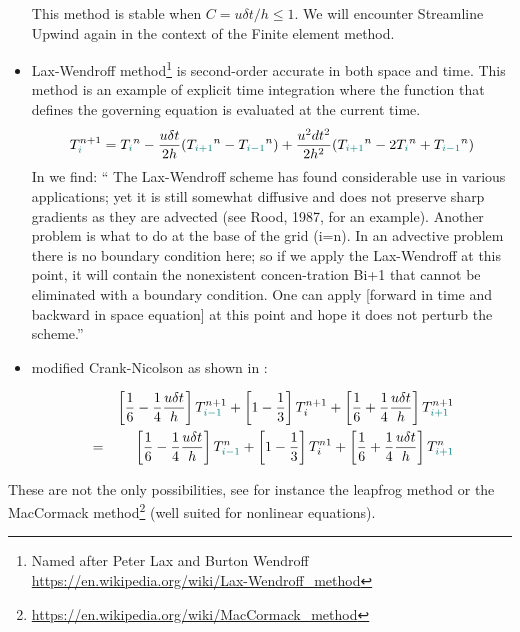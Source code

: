 \begin{itemize}
This method is stable when $C=u \delta t/h \leq 1$. 
We will encounter Streamline Upwind again in the context of the Finite element method.

\item {\color{olive} Lax-Wendroff method}\footnote{Named after Peter Lax 
and Burton Wendroff \url{https://en.wikipedia.org/wiki/Lax-Wendroff_method}} \cite{hoch}
is second-order accurate in both space and time. 
This method is an example of explicit time integration where the function that defines 
the governing equation is evaluated at the current time. 
\[
T^{n+1}_{\color{teal}i} = T_{\color{teal}i}^n 
- \frac{u \delta t}{2 h} (T_{\color{teal}i+1}^n-T_{\color{teal}i-1}^n)
+ \frac{u^2 dt^2}{2 h^2} (T_{\color{teal} i+1}^n-2 T_{\color{teal}i}^n+T_{\color{teal} i-1}^n)
\]
In \cite{boudreau} we find:
``
The Lax-Wendroff scheme has found considerable use in various applications; yet it
is still somewhat diffusive and does not preserve sharp gradients as they are advected
(see Rood, 1987, for an example). Another problem is what to do at the base of the
grid (i=n). In an advective problem there is no boundary condition here; so if we
apply the Lax-Wendroff at this point, it will contain the nonexistent concen-tration
Bi+1 that cannot be eliminated with a boundary condition. One can apply [forward in time and
backward in space equation] at this point and hope it does not perturb the scheme.''


\item {\color{olive} modified Crank-Nicolson} as shown in \textcite{beka}:

\begin{eqnarray}
&&\left[\frac16 -\frac14 \frac{u \delta t}{h}  \right] T^{n+1}_{\color{teal}i-1} + 
\left[1-\frac13  \right] T^{n+1}_{i} + 
\left[\frac16 +\frac14 \frac{u \delta t}{h}  \right] T^{n+1}_{\color{teal} i+1}  \nonumber\\
&=& 
\left[\frac16 -\frac14 \frac{u \delta t}{h}  \right] T^{n}_{\color{teal} i-1} + 
\left[1-\frac13  \right] T^{n1}_{i} + 
\left[\frac16 +\frac14 \frac{u \delta t}{h}  \right] T^{n}_{\color{teal} i+1} 
\end{eqnarray}


\end{itemize}
These are not the only possibilities, see for instance 
the {\color{olive} leapfrog method} or the
MacCormack method\footnote{\url{https://en.wikipedia.org/wiki/MacCormack_method}} (well suited for nonlinear equations).  
